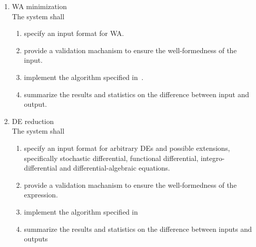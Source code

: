\begin{enumerate}[F 1.]
                \item WA minimization \\
                    The system shall
                    \begin{enumerate}[1.]
                        \item specify an input format for WA.
                        \item provide a validation machanism to ensure the well-formedness of the input.
                        \item implement the algorithm specified in~\autocite{Kiefer2013OnTC}.
                        \item summarize the results and statistics on the difference between input and output.
                    \end{enumerate}

                \item DE reduction \\
                    The system shall
                    \begin{enumerate}[1.]
                        \item specify an input format for arbitrary DEs and possible extensions, specifically stochastic differential, functional differential, integro-differential and differential-algebraic equations.
                        \item provide a validation machanism to ensure the well-formedness of the expression. 
                        \item implement the algorithm specified in~\autocite{Cardelli2017MaximalAO}
                        \item summarize the results and statistics on the difference between inputs and outputs
                    \end{enumerate}
            

\end{enumerate}
